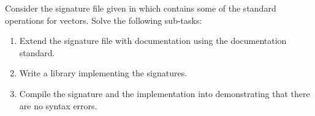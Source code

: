 Consider the signature file given in  which contains
some of the standard operations for vectors.
%
%
Solve the following sub-tasks:
\begin{enumerate}[label=\alph*)]
\item Extend the signature file with documentation using the documentation
standard.
\item Write a library  implementing the
  signatures.
\item Compile the signature and the implementation into
   demonstrating that there are no syntax
  errors.
\end{enumerate}